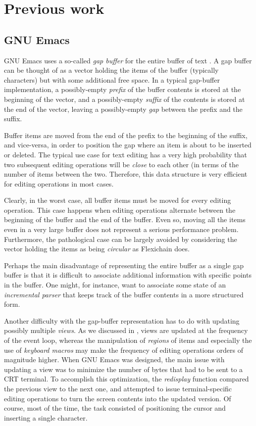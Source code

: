 \section{Previous work}

\subsection{GNU Emacs}

GNU Emacs uses a so-called \emph{gap buffer} for the entire buffer of
text \cite{GNUEmacsLispReferenceManual} \cite{CraftOfTextEditiing}.  A
gap buffer can be thought of as a vector holding the items of the
buffer (typically characters) but with some additional free space.  In
a typical gap-buffer implementation, a possibly-empty \emph{prefix} of
the buffer contents is stored at the beginning of the vector, and a
possibly-empty \emph{suffix} of the contents is stored at the end of
the vector, leaving a possibly-empty \emph{gap} between the prefix and
the suffix.

Buffer items are moved from the end of the prefix to the beginning of
the suffix, and vice-versa, in order to position the gap where an item
is about to be inserted or deleted.  The typical use case for text
editing has a very high probability that two subsequent editing
operations will be \emph{close} to each other (in terms of the number
of items between the two.  Therefore, this data structure is very
efficient for editing operations in most cases.

Clearly, in the worst case, all buffer items must be moved for every
editing operation.  This case happens when editing operations
alternate between the beginning of the buffer and the end of the
buffer.  Even so, moving all the items even in a very large buffer
does not represent a serious performance problem.  Furthermore, the
pathological case can be largely avoided by considering the vector
holding the items as being \emph{circular} as Flexichain
\cite{flexichain} does.

Perhaps the main disadvantage of representing the entire buffer as a
single gap buffer is that it is difficult to associate additional
information with specific points in the buffer.  One might, for
instance, want to associate some state of an \emph{incremental parser}
that keeps track of the buffer contents in a more structured form.

Another difficulty with the gap-buffer representation has to do with
updating possibly multiple \emph{views}.  As we discussed in
, views are updated at the frequency of the
event loop, whereas the manipulation of \emph{regions} of items and
especially the use of \emph{keyboard macros} may make the frequency of
editing operations orders of magnitude higher.  When GNU Emacs was
designed, the main issue with updating a view was to minimize the
number of bytes that had to be sent to a CRT terminal.  To accomplish
this optimization, the \emph{redisplay} function compared the previous
view to the next one, and attempted to issue terminal-specific editing
operations to turn the screen contents into the updated version.  Of
course, most of the time, the task consisted of positioning the cursor
and inserting a single character.

